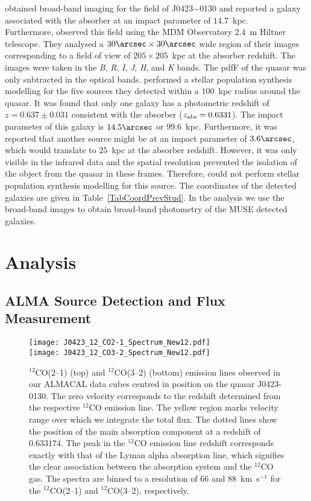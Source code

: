 \documentclass[a4paper,fleqn,usenatbib]{mnras}
\begin{document}
\mbox{\citet{Churchill1996spatial}} obtained broad-band imaging for the field of J0423$-$0130 and reported a galaxy associated with the absorber at an impact parameter of $14.7$~kpc.\\
Furthermore, \mbox{\citet{Rao2011groundbased}} observed this field using the MDM Observatory $2.4$~m Hiltner telescope. They analysed a $30\arcsec \times 30\arcsec$ wide region of their images corresponding to a field of view of $205 \times 205$~kpc at the absorber redshift. The images were taken in the \textit{B}, \textit{R}, \textit{I}, \textit{J}, \textit{H}, and \textit{K} bands. The pdfF of the quasar was only subtracted in the optical bands. \mbox{\citet{Rao2011groundbased}} performed a stellar population synthesis modelling for the five sources they detected within a $100$~kpc radius around the quasar. It was found that only one galaxy has a photometric redshift of $z = 0.637 \pm 0.031$ consistent with the absorber ($z_{\rm abs} = 0.6331$). The impact parameter of this galaxy is $14.5\arcsec$ or $99.6$~kpc. Furthermore, it was reported that another source might be at an impact parameter of $3.6\arcsec$, which would translate to $25$~kpc at the absorber redshift. However, it was only visible in the infrared data and the spatial resolution prevented the isolation of the object from the quasar in these frames. Therefore, \mbox{\citet{Rao2011groundbased}} could not perform stellar population synthesis modelling for this source. The coordinates of the detected galaxies are given in Table~\ref{TabCoordPrevStud}. In the analysis we use the broad-band images to obtain broad-band photometry of the MUSE detected galaxies.


\section{Analysis}

\subsection{ALMA Source Detection and Flux Measurement}
\label{SubsecALMAdata}

\begin{figure}
\texttt{[image: J0423\_12\_CO2-1\_Spectrum\_New12.pdf]}\vspace{-1.2cm} \\
\texttt{[image: J0423\_12\_CO3-2\_Spectrum\_New12.pdf]}
\caption{$^{12}$CO(2--1) (top) and $^{12}$CO(3--2) (bottom) emission lines observed in our ALMACAL data cubes centred in position on the quasar J0423-0130. The zero velocity corresponds to the redshift determined from the respective $^{12}$CO emission line. The yellow region marks velocity range over which we integrate the total flux. The dotted lines show the position of the main absorption component at a redshift of $0.633174$. The peak in the $^{12}$CO emission line redshift corresponds exactly with that of the Lyman alpha absorption line, which signifies the clear association between the absorption system and the $^{12}$CO gas. The spectra are binned to a resolution of 66 and 88~km~s$^{-1}$ for the $^{12}$CO(2--1) and $^{12}$CO(3--2), respectively.}
\label{FigCOspectra}
\end{figure}
\end{document}
